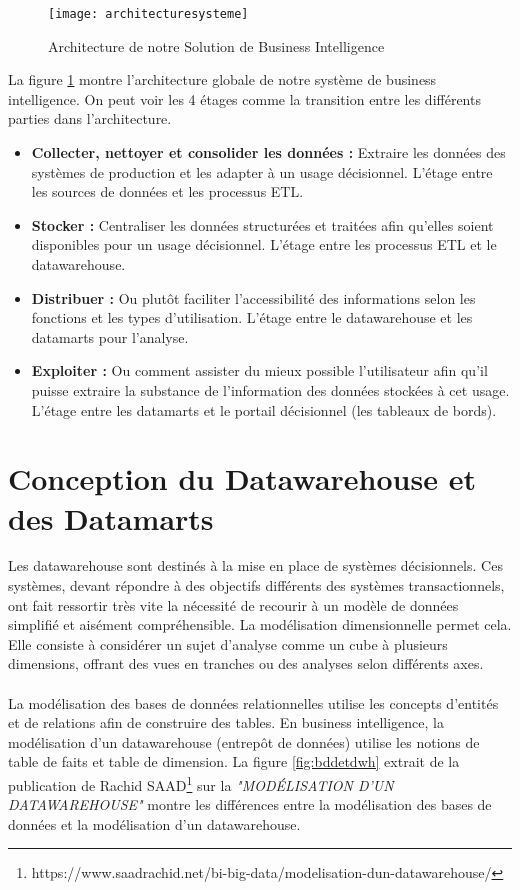 \begin{figure}[H]
    \centering
    \texttt{[image: architecturesysteme]}
    \caption{Architecture de notre Solution de Business Intelligence}
    \label{fig:architecturesysteme}
\end{figure}

La figure \ref{fig:architecturesysteme} montre l’architecture globale de notre système de business intelligence. On peut voir les 4 étages comme la transition entre les différents parties dans l'architecture.

\begin{itemize}
    \item \textbf{Collecter, nettoyer et consolider les données :} Extraire les données des systèmes de production et les adapter à un usage décisionnel. L'étage entre les sources de données et les processus ETL.
    \item \textbf{Stocker :} Centraliser les données structurées et traitées afin qu'elles soient disponibles pour un usage décisionnel. L'étage entre les processus ETL et le datawarehouse.
    \item \textbf{Distribuer :} Ou plutôt faciliter l'accessibilité des informations selon les fonctions et les types d'utilisation. L'étage entre le datawarehouse et les datamarts pour l'analyse.
    \item \textbf{Exploiter :} Ou comment assister du mieux possible l'utilisateur afin qu'il puisse extraire la substance de l'information des données stockées à cet usage. L'étage entre les datamarts et le portail décisionnel (les tableaux de bords).
\end{itemize}

\section{Conception du Datawarehouse et des Datamarts}
Les datawarehouse sont destinés à la mise en place de systèmes décisionnels. Ces systèmes, devant répondre à des objectifs différents des systèmes transactionnels, ont fait ressortir très vite la nécessité de recourir à un modèle de données simplifié et aisément compréhensible. La modélisation dimensionnelle permet cela. Elle consiste à considérer un sujet d’analyse comme un cube à plusieurs dimensions, offrant des vues en tranches ou des analyses selon différents axes.
\paragraph{}
La modélisation des bases de données relationnelles utilise les concepts d’entités et de relations afin de construire des tables. En business intelligence, la modélisation d’un datawarehouse (entrepôt de données) utilise les notions de table de faits et table de dimension. La figure \ref{fig:bddetdwh} extrait de la publication de Rachid SAAD\footnote{https://www.saadrachid.net/bi-big-data/modelisation-dun-datawarehouse/} sur la \textit{"MODÉLISATION D’UN DATAWAREHOUSE"} montre les différences entre la modélisation des bases de données et la modélisation d’un datawarehouse.

